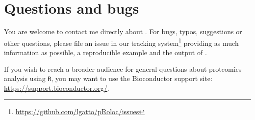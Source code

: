 \section*{Questions and bugs}

You are welcome to contact me directly about . For
bugs, typos, suggestions or other questions, please file an issue in
our tracking
system\footnote{\url{https://github.com/lgatto/pRoloc/issues}}
providing as much information as possible, a reproducible example and
the output of .

If you wish to reach a broader audience for general questions about
proteomics analysis using \texttt{R}, you may want to use the
Bioconductor support site: \url{https://support.bioconductor.org/}.

